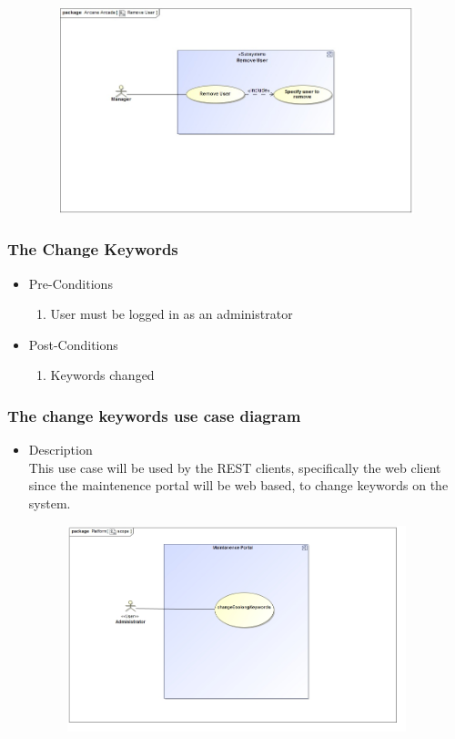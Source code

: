 \documentclass[english]{article}
\begin{document}
	
		\includegraphics[width=14cm,height=6cm,keepaspectratio]{removeUser.jpg}
		
				
		
		\subsubsection{The Change Keywords}
		
			\begin{itemize}
	
		
		\item Pre-Conditions
			\begin{enumerate}
				\item User must be logged in as an administrator
			\end{enumerate}
		\item Post-Conditions
			\begin{enumerate}
			\item Keywords changed
						
			\end{enumerate}
		

		\end{itemize}
		
		
		
		
		
		\subsubsection* {The change keywords use case diagram}
		\begin{itemize}
			\item Description\\
			This use case will be used by the REST clients, specifically the web client since the maintenence portal will be web based, to change keywords on the system.
		\end{itemize}
		\includegraphics[width=14cm,height=6cm,keepaspectratio]{keyWords.jpg}	
		
\end{document}
